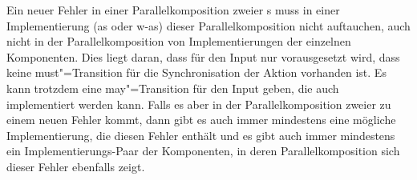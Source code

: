 Ein neuer Fehler in einer Parallelkomposition zweier \MEIO{}s
muss in einer Implementierung (as oder w-as) dieser Parallelkomposition nicht
auftauchen, auch nicht in der Parallelkomposition von Implementierungen der
einzelnen Komponenten. Dies liegt daran, dass für den Input nur vorausgesetzt
wird, dass keine must"=Transition für die Synchronisation der Aktion vorhanden
ist. Es kann trotzdem eine may"=Transition für den Input geben, die auch
implementiert werden kann. Falls es aber in der Parallelkomposition zweier
\MEIO{} zu einem neuen Fehler kommt, dann gibt es auch immer mindestens eine
mögliche Implementierung, die diesen Fehler enthält und es gibt auch immer
mindestens ein Implementierungs-Paar der Komponenten, in deren
Parallelkomposition sich dieser Fehler ebenfalls zeigt.

